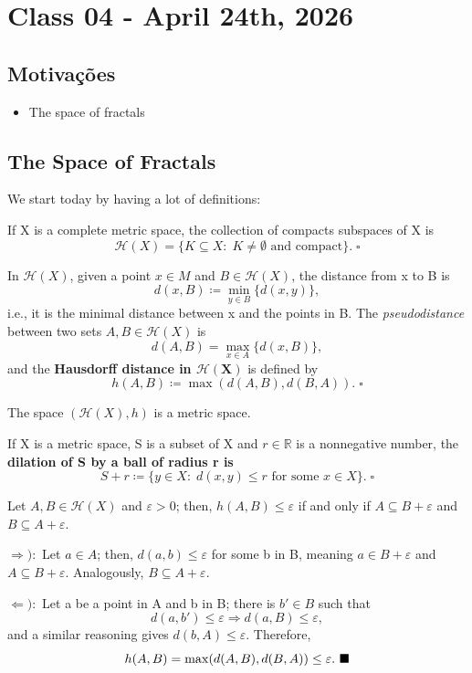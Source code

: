 \documentclass[../fractals_everywhere.tex]{subfiles}
\begin{document}
\section{Class 04 - April 24th, 2026}
\subsection{Motivações}
\begin{itemize}
	\item The space of fractals
\end{itemize}
\subsection{The Space of Fractals}
We start today by having a lot of definitions:
\begin{def*}
	If X is a complete metric space, the collection of compacts subspaces of X is
	\[
		\mathcal{H}(X) = \{K\subseteq X: \; K \neq\emptyset \text{ and compact}\}.\; \square
	\]
\end{def*}
\begin{def*}
	In \(\mathcal{H}(X)\), given a point \(x\in M\) and \(B\in \mathcal{H}(X)\), the distance from x to B is
	\[
		d(x, B)\coloneqq \min\limits_{y\in B}\{d(x, y)\},
	\]
	i.e., it is the minimal distance between x and the points in B. The \textit{pseudodistance} between two sets \(A, B\in \mathcal{H}(X)\) is
	\[
		d(A, B)=\max\limits_{x\in A}\{d(x, B)\},
	\]
	and the \textbf{Hausdorff distance in \(\mathbf{\mathcal{H}(X)}\)} is defined by
	\[
		h(A, B) \coloneqq \max\limits_{}(d(A, B), d(B, A)).\; \square
	\]
\end{def*}
\begin{theorem*}
	The space \((\mathcal{H}(X), h)\) is a metric space.
\end{theorem*}
\begin{def*}
	If X is a metric space, S is a subset of X and \(r\in \mathbb{R}\) is a nonnegative number, the \textbf{dilation of S by a ball of radius r is}
	\[
		S+r\coloneqq \{y\in X:\; d(x, y)\leq r \text{ for some }x\in X\}.\; \square
	\]
\end{def*}
\begin{lemma*}
	Let \(A, B\in \mathcal{H}(X)\) and \(\varepsilon >0\); then, \(h(A, B)\leq \varepsilon \) if and only if \(A\subseteq B+\varepsilon \) and \(B\subseteq A+\varepsilon \).
\end{lemma*}
\begin{proof*}
	\(\Rightarrow ):\) Let \(a\in A\); then, \(d(a, b)\leq \varepsilon \) for some b in B, meaning \(a\in B+\varepsilon \) and \(A\subseteq B+\varepsilon \). Analogously, \(B\subseteq A+\varepsilon \).

	\(\Leftarrow ):\) Let a be a point in A and b in B; there is \(b'\in B\) such that
	\[
		d(a, b')\leq \varepsilon  \Rightarrow d(a, B)\leq \varepsilon ,
	\]
	and a similar reasoning gives \(d(b, A)\leq \varepsilon \). Therefore,
	\[
		h(A, B)=\max\limits_{}(d(A, B), d(B, A))\leq \varepsilon . \text{ $\blacksquare$}
	\]
\end{proof*}
\end{document}
